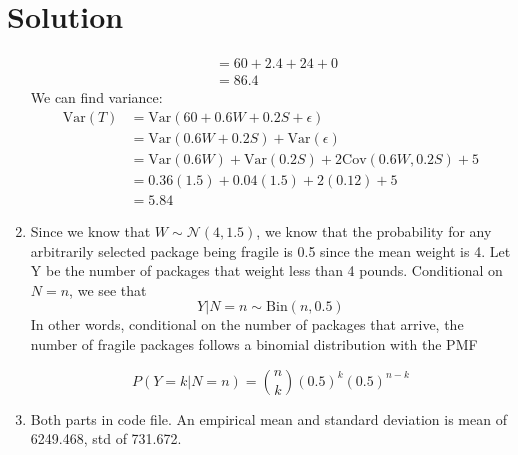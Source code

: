 \documentclass{../harvardml}
\theoremstyle{definition}
\theoremstyle{plain}
\newenvironment{solution}
  {\color{blue}\section*{Solution}}
{}
\begin{document}
\begin{solution}
\begin{enumerate}
\begin{align*}
            &= 60 + 2.4 + 24 + 0 \\
            &= 86.4
        \end{align*}
        We can find variance:
        \begin{align*}
            \mathrm{Var}(T) &= \mathrm{Var}( 60 + 0.6W + 0.2S + \epsilon) \\
            &= \mathrm{Var}(0.6W + 0.2S) + \mathrm{Var}(\epsilon) \\
            &= \mathrm{Var}(0.6W) + \mathrm{Var}(0.2S) + 2\mathrm{Cov}(0.6W, 0.2S) + 5 \\
            &= 0.36(1.5) + 0.04(1.5) + 2(0.12) + 5 \\
            &= 5.84
        \end{align*}
        \item Since we know that $W \sim \mathcal{N}(4, 1.5)$, we know that the probability for any arbitrarily selected package being fragile is 0.5 since the mean weight is 4. Let Y be the number of packages that weight less than 4 pounds. Conditional on $N = n$, we see that
        \[
        Y | N = n \sim \mathrm{Bin}(n, 0.5)
        \]
        In other words, conditional on the number of packages that arrive, the number of fragile packages follows a binomial distribution with the PMF

        \[
        P(Y = k | N = n) = \binom{n}{k}(0.5)^k(0.5)^{n-k}
        \]
        \item Both parts in code file. An empirical mean and standard deviation is mean of 6249.468, std of 731.672.
		\end{enumerate}
\end{solution} 

\newpage 
\end{document}
